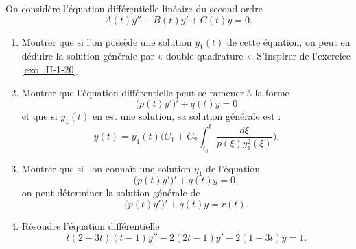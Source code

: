 \begin{exercice}\label{exo_II-1-21}

On considère l'équation différentielle linéaire du second ordre
\begin{equation}
	A(t)y''+B(t)y'+C(t)y=0.
\end{equation}

\begin{enumerate}
\item 
Montrer que si l'on possède une solution $y_1(t)$ de cette équation, on peut en déduire la solution générale par « double quadrature ». S'inspirer de l'exercice \ref{exo_II-1-20}.


\item
Montrer que l'équation différentielle peut se ramener à la forme
\begin{equation}
	\big( p(t)y' \big)'+q(t)y=0
\end{equation}
et que si $y_1(t)$ en est une solution, sa solution générale est :
\begin{equation}
	y(t)=y_1(t)\Big(   C_1+C_2\int_{t_0}^t\frac{ d\xi }{ p(\xi)y_1^2(\xi) } \Big).
\end{equation}

\item 
Montrer que si l'on connaît une solution $y_1$ de l'équation
\begin{equation}
	\big( p(t)y' \big)'+q(t)y=0,
\end{equation}
on peut déterminer la solution générale de
\begin{equation}
	\big( p(t)y' \big)'+q(t)y=r(t).
\end{equation}

\item
Résoudre l'équation différentielle
\begin{equation}
	t(2-3t)(t-1)y''-2(2t-1)y'-2(1-3t)y=1.
\end{equation}

\end{enumerate}


\end{exercice}



